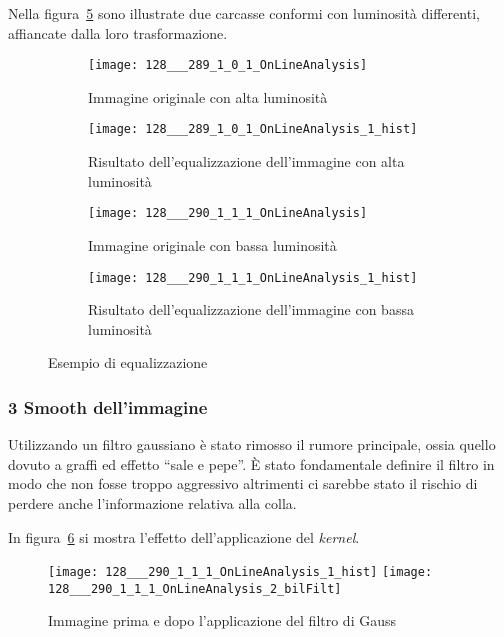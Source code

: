 Nella figura~\ref{fig:equalizzazione} sono illustrate due carcasse conformi con luminosità differenti, affiancate dalla loro trasformazione.
\begin{figure}[ht] %
  \begin{center}
    \begin{subfigure}{.49\linewidth}
      \centering\texttt{[image: 128\_\_\_289\_1\_0\_1\_OnLineAnalysis]}
      \caption{Immagine originale con alta luminosità}
      \label{fig:p2_originale_lum}
    \end{subfigure}
    \begin{subfigure}{.49\linewidth}
      \centering\texttt{[image: 128\_\_\_289\_1\_0\_1\_OnLineAnalysis\_1\_hist]}
      \caption{Risultato dell'equalizzazione dell'immagine con alta luminosità}
      \label{fig:p2_equalizzata_lum}
    \end{subfigure}

    \begin{subfigure}{.49\linewidth}
      \centering\texttt{[image: 128\_\_\_290\_1\_1\_1\_OnLineAnalysis]}
      \caption{Immagine originale con bassa luminosità}
      \label{fig:p2_originale_scura}
    \end{subfigure}
    \begin{subfigure}{.49\linewidth}
      \centering\texttt{[image: 128\_\_\_290\_1\_1\_1\_OnLineAnalysis\_1\_hist]}
      \caption{Risultato dell'equalizzazione dell'immagine con bassa luminosità}
      \label{fig:p2_equalizzata_scura}
    \end{subfigure}

  \end{center}
  \caption{Esempio di equalizzazione}
  \label{fig:equalizzazione}
\end{figure}

\subsubsection{3 Smooth dell'immagine}
Utilizzando un filtro gaussiano è stato rimosso il rumore principale, ossia quello dovuto a graffi ed effetto ``sale e pepe''.
È stato fondamentale definire il filtro in modo che non fosse troppo aggressivo altrimenti ci sarebbe stato il rischio di perdere anche l'informazione relativa alla colla.

In figura~\ref{fig:smooth} si mostra l'effetto dell'applicazione del \textit{kernel}.
\begin{figure}[ht] %
  \begin{center}
    \texttt{[image: 128\_\_\_290\_1\_1\_1\_OnLineAnalysis\_1\_hist]}
    \texttt{[image: 128\_\_\_290\_1\_1\_1\_OnLineAnalysis\_2\_bilFilt]}
    \caption{Immagine prima e dopo l'applicazione del filtro di Gauss}
    \label{fig:smooth}
  \end{center}
\end{figure}

